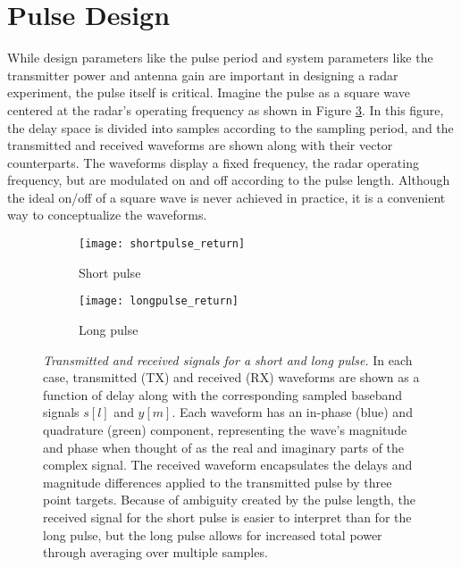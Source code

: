 \section{Pulse Design}
\label{pulse_design}
While design parameters like the pulse period and system parameters like the transmitter power and antenna gain are important in designing a radar experiment, the pulse itself is critical. Imagine the pulse as a square wave centered at the radar's operating frequency as shown in Figure \ref{fig:pulse_returns}. In this figure, the delay space is divided into samples according to the sampling period, and the transmitted and received waveforms are shown along with their vector counterparts. The waveforms display a fixed frequency, the radar operating frequency, but are modulated on and off according to the pulse length. Although the ideal on/off of a square wave is never achieved in practice, it is a convenient way to conceptualize the waveforms.
\begin{figure}[tpb]
 \centering
 \begin{subfigure}{0.5\textwidth}
  \centering
  \texttt{[image: shortpulse\_return]}
  \caption{Short pulse}
  \label{fig:short_pulse_return}
 \end{subfigure}%
 \begin{subfigure}{0.5\textwidth}
  \centering
  \texttt{[image: longpulse\_return]}
  \caption{Long pulse}
  \label{fig:long_pulse_return}
 \end{subfigure}
 \caption[Transmitted and received signals for a short and long pulse]{\emph{Transmitted and received signals for a short and long pulse.} In each case, transmitted (TX) and received (RX) waveforms are shown as a function of delay along with the corresponding sampled baseband signals $s[l]$ and $y[m]$. Each waveform has an in-phase (blue) and quadrature (green) component, representing the wave's magnitude and phase when thought of as the real and imaginary parts of the complex signal. The received waveform encapsulates the delays and magnitude differences applied to the transmitted pulse by three point targets. Because of ambiguity created by the pulse length, the received signal for the short pulse is easier to interpret than for the long pulse, but the long pulse allows for increased total power through averaging over multiple samples.}
 \label{fig:pulse_returns}
\end{figure}%

